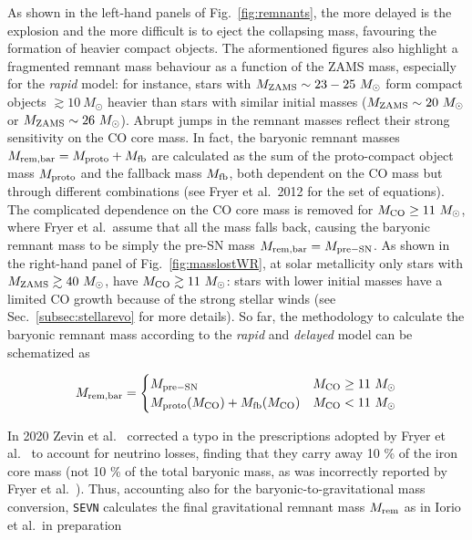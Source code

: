 \documentclass[a4paper,titlepage]{book}     	%
\newcommand{\sun}{\ensuremath{_\odot}}
\newcommand{\mzams}{M_\textup{ZAMS}}
\newcommand{\msun}{\ensuremath{M\sun}}
\begin{document}
As shown in the left-hand panels of Fig.\ \ref{fig:remnants}, the more delayed is the explosion and the more difficult is to eject the collapsing mass, favouring the formation of heavier compact objects. The aformentioned figures also highlight a fragmented remnant mass behaviour as a function of the ZAMS mass, especially for the \emph{rapid} model: for instance, stars with $\mzams \sim 23-25~\msun$ form compact objects $\gtrsim 10~\msun$ heavier than stars with similar initial masses ($\mzams \sim 20~\msun$ or $\mzams \sim 26~\msun$). Abrupt jumps in the remnant masses reflect their strong sensitivity on the CO core mass. In fact, the baryonic remnant masses $M_{\rm rem, bar}=M_{\rm proto} + M_{\rm fb} $ are calculated as the sum of the proto-compact object mass $M_{\rm proto}$ and the fallback mass $M_{\rm fb}$, both dependent on the CO mass but through different combinations (see Fryer et al.\ 2012 \cite{Fryer2012} for the set of equations). The complicated dependence on the CO core mass is removed for $M_{\rm CO} \geq 11~\msun$, where Fryer et al.\ assume that all the mass falls back, causing the baryonic remnant mass to be simply the pre-SN mass $M_{\rm rem, bar} = M_{\rm pre-SN}$. As shown in the right-hand panel of Fig.\ \ref{fig:masslostWR}, at solar metallicity only stars with $\mzams \gtrsim 40~\msun$, have $M_{\rm CO} \gtrsim 11~\msun$: stars with lower initial masses have a limited CO growth because of the strong stellar winds (see Sec.\ \ref{subsec:stellarevo} for more details). So far, the methodology to calculate the baryonic remnant mass according to the \emph{rapid} and \emph{delayed} model can be schematized as 

\begin{equation}\label{eq:fryermass}
    M_{\rm rem, bar} = 
    \begin{cases}
    M_{\rm pre-SN} & M_{\rm CO} \geq 11~\msun \\
    M_{\rm proto}(M_{\rm CO}) + M_{\rm fb}(M_{\rm CO}) & M_{\rm CO} < 11~\msun 
    \end{cases}
\end{equation}

In 2020 Zevin et al.\ \cite{Zevin2020_neutrinolosses} corrected a typo in the prescriptions adopted by Fryer et al.\ \cite{Fryer2012} to account for neutrino losses, finding that they carry away 10 \% of the iron core mass (not 10 \% of the total baryonic mass, as was incorrectly reported by Fryer et al.\ ). Thus, accounting also for the baryonic-to-gravitational mass conversion, \texttt{SEVN} calculates the final gravitational remnant mass $M_{\rm rem}$ as in Iorio et al.\ in preparation
\end{document}

